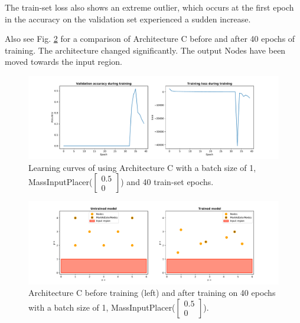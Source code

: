 The train-set loss also shows an extreme outlier, which occurs at the first epoch in the accuracy on the validation set experienced a sudden increase. 

Also see Fig. \ref{fig:arch_c_const_vel_50pc_architecture} for a comparison of Architecture C before and after 40 epochs of training. The architecture changed significantly. The output Nodes have been moved towards the input region.

\begin{figure}[hb]
	\centering
	\includegraphics[scale=0.4]{figures/C_batch1_ConstVelInputPlacer([0.5, 0]])_epoch40_stats.pdf}
	\caption{Learning curves of using Architecture C with 
		a batch size of 1, MassInputPlacer($\begin{bmatrix} 0.5\\0\end{bmatrix}$) and 40 train-set epochs.}
	\label{fig:arch_c_const_vel_50pc_learning_curve}
\end{figure}

\begin{figure}[hb]
	\centering
	\includegraphics[scale=0.4]{figures/C_batch1_ConstVelInputPlacer([0.5, 0]])_epoch40.pdf}
	\caption{Architecture C before training (left) and after training on 40 epochs with 
		a batch size of 1, MassInputPlacer($\begin{bmatrix} 0.5\\0\end{bmatrix}$).}
	\label{fig:arch_c_const_vel_50pc_architecture}
\end{figure}

\clearpage